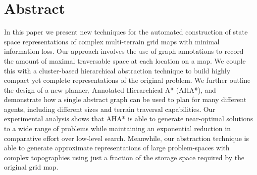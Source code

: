 \section{Abstract}
In this paper we present new techniques for the automated construction of state space representations of complex multi-terrain grid maps with minimal information loss. Our approach involves the use of graph annotations to record the amount of maximal traversable space at each location on a map. We couple this with a cluster-based hierarchical abstraction technique to build highly compact yet complete representations of the original problem. We further outline the design of a new planner, Annotated Hierarchical A* (AHA*), and demonstrate how a single abstract graph can be used to plan for many different agents, including different sizes and terrain traversal capabilities. 
Our experimental analysis shows that AHA* is able to generate near-optimal solutions to a wide range of problems while maintaining an exponential reduction in comparative effort over low-level search. 
Meanwhile, our abstraction technique is able to generate approximate representations of large problem-spaces with complex topographies using just a fraction of the storage space required by the original grid map.
